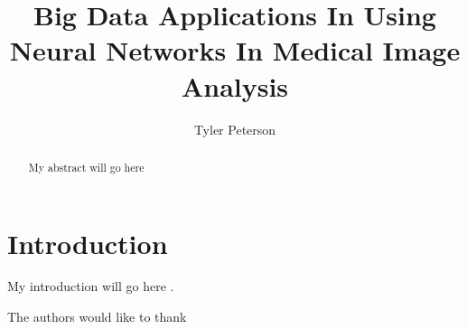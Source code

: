 \documentclass[sigconf]{acmart}
\begin{document}
\title{Big Data Applications In Using Neural Networks In Medical Image Analysis}


\author{Tyler Peterson}



\renewcommand{\shortauthors}{B. Trovato et al.}


\begin{abstract}

  My abstract will go here
  
\end{abstract}



\maketitle

\section{Introduction}

My introduction will go here \cite{editor00}.


\begin{acks}

  The authors would like to thank 

\end{acks}


 
\end{document}
